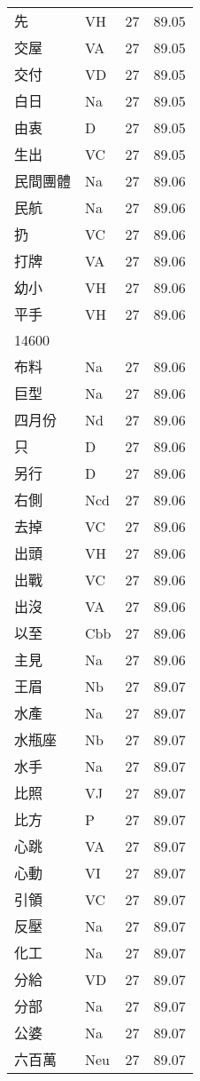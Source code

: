 \documentclass[twocolumn]{book}
\begin{document}
\begin{supertabular}{llrr}
先 & VH & 27 &  89.05\\
交屋 & VA & 27 &  89.05\\
交付 & VD & 27 &  89.05\\
白日 & Na & 27 &  89.05\\
由衷 & D & 27 &  89.05\\
生出 & VC & 27 &  89.05\\
民間團體 & Na & 27 &  89.06\\
民航 & Na & 27 &  89.06\\
扔 & VC & 27 &  89.06\\
打牌 & VA & 27 &  89.06\\
幼小 & VH & 27 &  89.06\\
平手 & VH & 27 &  89.06\\
14600\\
布料 & Na & 27 &  89.06\\
巨型 & Na & 27 &  89.06\\
四月份 & Nd & 27 &  89.06\\
只 & D & 27 &  89.06\\
另行 & D & 27 &  89.06\\
右側 & Ncd & 27 &  89.06\\
去掉 & VC & 27 &  89.06\\
出頭 & VH & 27 &  89.06\\
出戰 & VC & 27 &  89.06\\
出沒 & VA & 27 &  89.06\\
以至 & Cbb & 27 &  89.06\\
主見 & Na & 27 &  89.06\\
王眉 & Nb & 27 &  89.07\\
水產 & Na & 27 &  89.07\\
水瓶座 & Nb & 27 &  89.07\\
水手 & Na & 27 &  89.07\\
比照 & VJ & 27 &  89.07\\
比方 & P & 27 &  89.07\\
心跳 & VA & 27 &  89.07\\
心動 & VI & 27 &  89.07\\
引領 & VC & 27 &  89.07\\
反壓 & Na & 27 &  89.07\\
化工 & Na & 27 &  89.07\\
分給 & VD & 27 &  89.07\\
分部 & Na & 27 &  89.07\\
公婆 & Na & 27 &  89.07\\
六百萬 & Neu & 27 &  89.07\\

\end{supertabular}
\end{document}
